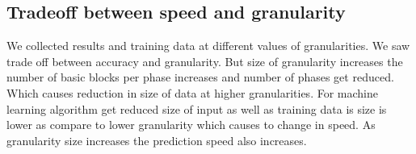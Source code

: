 \subsection{Tradeoff between speed and granularity}
We collected results and training data at different values of granularities. We saw trade off between accuracy and granularity.  But size of granularity increases the number of basic blocks per phase increases and number of phases get reduced. Which causes reduction in size of data at higher granularities. For machine learning algorithm get reduced size of input as well as training data is size is lower as compare to lower granularity which causes to change in speed. As granularity size increases the prediction speed also increases. 